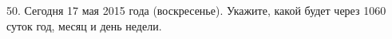 50. Сегодня 17 мая 2015 года (воскресенье). Укажите, какой будет через 1060 суток год, месяц и день недели.\\
